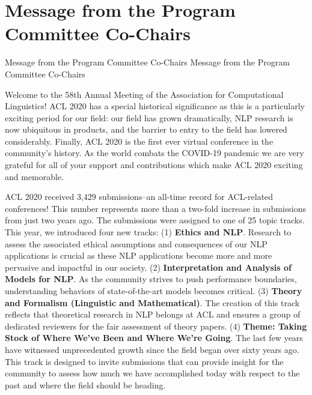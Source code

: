 \section{Message from the Program Committee Co-Chairs}\vspace{2em}
\setheaders%
    {Message from the Program Committee Co-Chairs}%
    {Message from the Program Committee Co-Chairs}
\thispagestyle{emptyheader}

\setlength{\parskip}{.7ex}

Welcome to the 58th Annual Meeting of the Association for Computational Linguistics! ACL 2020 has a special historical significance as this is a particularly exciting period for our field: our field has grown dramatically, NLP research is now ubiquitous in products, and the barrier to entry to the field has lowered considerably.  Finally, ACL 2020 is the first ever virtual conference in the community's history. As the world combats the COVID-19 pandemic we are very grateful for all of your support and contributions which make ACL 2020 exciting and memorable. 

ACL 2020 received 3,429 submissions--an all-time record for ACL-related conferences!  This number represents more than a two-fold increase in submissions from just two years ago.
The submissions were assigned to one of 25 topic tracks. This year, we introduced four new tracks:  (1) \textbf{Ethics and NLP}. Research to assess the associated ethical assumptions and consequences of our NLP applications is crucial as these NLP applications become more and more pervasive and impactful in our society.  (2) \textbf{Interpretation and Analysis of Models for NLP}.  As the community strives to push performance boundaries, understanding behaviors of state-of-the-art models becomes critical. (3) \textbf{Theory and Formalism (Linguistic and Mathematical)}. The creation of this track reflects that theoretical research in NLP belongs at ACL and ensures a group of dedicated reviewers for the fair assessment of theory papers.  
(4) \textbf{Theme: Taking Stock of Where We've Been and Where We're Going}. The last few years have witnessed unprecedented growth since the field began over sixty years ago. This track is designed to invite submissions that can provide insight for the community to assess how much we have accomplished today with respect to the past and where the field should be heading.

